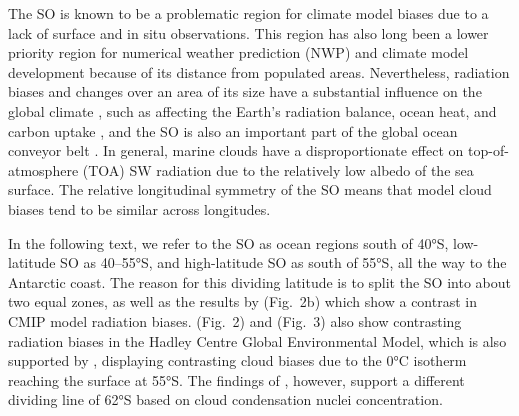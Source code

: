 \documentclass[draft]{agujournal2019}
\begin{document}
The SO is known to be a problematic region for climate model biases \cite{schuddeboom2021,hyder2018,cesana2022,zhao2022} due to a lack of surface and in situ observations. This region has also long been a lower priority region for numerical weather prediction (NWP) and climate model development because of its distance from populated areas. Nevertheless, radiation biases and changes over an area of its size have a substantial influence on the global climate \cite{rintoul2011,bodas-salcedo2012}, such as affecting the Earth's radiation balance, ocean heat, and carbon uptake \cite{williams2023}, and the SO is also an important part of the global ocean conveyor belt \cite{wang2014b}. In general, marine clouds have a disproportionate effect on top-of-atmosphere (TOA) SW radiation due to the relatively low albedo of the sea surface. The relative longitudinal symmetry of the SO means that model cloud biases tend to be similar across longitudes.

In the following text, we refer to the SO as ocean regions south of 40°S, low-latitude SO as 40–55°S, and high-latitude SO as south of 55°S, all the way to the Antarctic coast. The reason for this dividing latitude is to split the SO into about two equal zones, as well as the results by  (Fig.~2b) which show a contrast in CMIP model radiation biases.  (Fig.~2) and  (Fig.~3) also show contrasting radiation biases in the Hadley Centre Global Environmental Model, which is also supported by , displaying contrasting cloud biases due to the 0°C isotherm reaching the surface at 55°S. The findings of , however, support a different dividing line of 62°S based on cloud condensation nuclei concentration.
\end{document}
